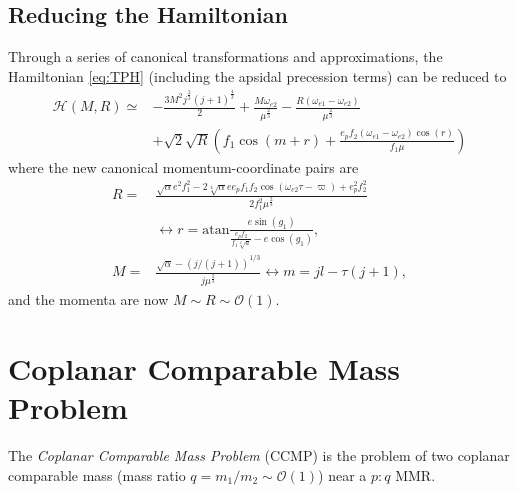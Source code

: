 \documentclass[usenatbib,twocolumn]{mnras}
\begin{document}
\subsection{Reducing the Hamiltonian}
Through a series of canonical transformations and approximations, the Hamiltonian \ref{eq:TPH} (including the apsidal precession terms) can be reduced to 
\begin{align}
    \mathcal H(M,R) \simeq& - \frac{3 M^{2} j^{\frac{2}{3}} \left(j + 1\right)^{\frac{4}{3}}}{2} + \frac{M \omega_{{e}2}}{\mu^{\frac{2}{3}}} 
    - \frac{R \left( \omega_{{e}1} - \omega_{{e}2}\right)}{\mu^{\frac{2}{3}}}
    \nonumber\\
    &+ \sqrt{2} \sqrt{R} \left(f_{1} \cos{\left(m + r \right)}
        +\frac{e_{p} f_{2} \left(\omega_{{e}1} - \omega_{{e}2}\right) \cos{\left(r \right)}}{f_{1} \mu}\right)
\end{align}
where the new canonical momentum-coordinate pairs are
\begin{align}
    R =& \frac{\sqrt{\alpha} e^{2} f_{1}^{2} - 2 \sqrt[4]{\alpha} e e_{p} f_{1} f_{2} \cos{\left(\omega_{{e}2} \tau - \varpi \right)} + e_{p}^{2} f_{2}^{2}}{2 f_{1}^{2} \mu^{\frac{2}{3}}}\\
    &\leftrightarrow r = \mathrm{atan}\frac{e \sin{\left(g_{1} \right)}}{ \frac{e_{p} f_{2}}{f_{1} \sqrt[4]{a}}- e \cos{\left(g_{1} \right)}},\\
    M=&\frac{\sqrt{\alpha}- (j/(j+1))^{1/3} }{j \mu^{\frac{2}{3}}}
    \leftrightarrow m =  j l - \tau \left(j + 1\right),
\end{align}
and the momenta are now $M\sim R \sim\mathcal O(1)$.


\section{Coplanar Comparable Mass Problem}
The \emph{Coplanar Comparable Mass Problem} (CCMP) is the problem of two coplanar comparable mass (mass ratio $q=m_1/m_2\sim\mathcal O(1)$) near a $p:q$ MMR.
\end{document}
